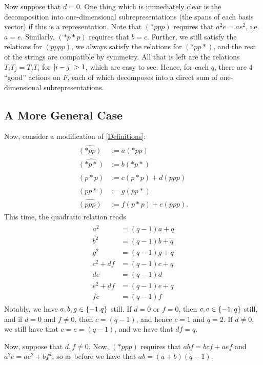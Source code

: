 \documentclass{amsart}
\begin{document}
Now suppose that $d = 0$.
One thing which is immediately clear is the decomposition into one-dimensional subrepresentations (the spans of each basis vector) if this is a representation.
Note that $(*ppp)$ requires that $a^2e = ae^2$, i.e. $a = e$.
Similarly, $(*p*p)$ requires that $b = c$.
Further, we still satisfy the relations for $(pppp)$, we always satisfy the relations for $(*pp*)$, and the rest of the strings are compatible by symmetry.
All that is left are the relations $T_iT_j = T_jT_i$ for $\left| i - j \right| > 1$, which are easy to see.
Hence, for each $q$, there are 4 ``good'' actions on $F$, each of which decomposes into a direct sum of one-dimensional subrepresentations.

\subsection*{A More General Case}
Now, consider a modification of \eqref{Definitions}:
\begin{align}
  \begin{split}
  \widehat{(*pp)} &:= a(*pp)\\
  \widehat{(*p*)} &:= b(*p*)\\
  \widehat{(p*p)} &:= c(p*p) + d(ppp)\\
  \widehat{(pp*)} &:= g(pp*)\\
  \widehat{(ppp)} &:= f(p*p) + e(ppp).
  \end{split}
  \label{General Definitions}
\end{align} 
This time, the quadratic relation reads
\begin{align}
  \begin{split}
  a^2 &= (q-1)a + q\\
  b^2 &= (q-1)b + q\\
  g^2 &= (q-1)g + q\\
  c^2 + df &= (q -1)c + q\\
  de &= (q-1)d\\
  e^2 + df &= (q -1)e + q\\
  fc &= (q-1)f
\end{split}
  \label{General Quadratic}
\end{align}
Notably, we have $a,b,g \in \left\{ -1.q \right\}$ still.
If $d = 0$ or $f = 0$, then $c,e \in \left\{ -1,q \right\}$ still, and if $d = 0$ and $f \neq 0$, then $c = (q-1)$, and hence $c = 1$ and $q = 2$.
If $d \neq 0$, we still have that $c = e = (q-1)$, and we have that $df = q$.

Now, suppose that $d,f \neq 0$.
Now, $(*ppp)$ requires that $abf = bcf + aef$ and $a^2e = ae^2 + bf^2$, so as before we have that $ab = (a+b)(q-1)$.
\end{document}
